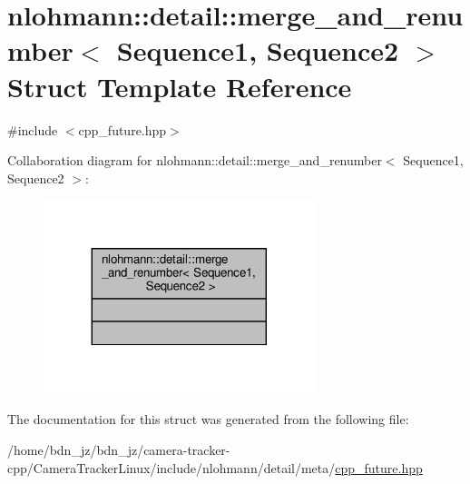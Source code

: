 \hypertarget{structnlohmann_1_1detail_1_1merge__and__renumber}{}\section{nlohmann\+:\+:detail\+:\+:merge\+\_\+and\+\_\+renumber$<$ Sequence1, Sequence2 $>$ Struct Template Reference}
\label{structnlohmann_1_1detail_1_1merge__and__renumber}


{\ttfamily \#include $<$cpp\+\_\+future.\+hpp$>$}



Collaboration diagram for nlohmann\+:\+:detail\+:\+:merge\+\_\+and\+\_\+renumber$<$ Sequence1, Sequence2 $>$\+:
\nopagebreak
\begin{figure}[H]
\begin{center}
\leavevmode
\includegraphics[width=224pt]{structnlohmann_1_1detail_1_1merge__and__renumber__coll__graph}
\end{center}
\end{figure}


The documentation for this struct was generated from the following file\+:\begin{DoxyCompactItemize}
\item 
/home/bdn\+\_\+jz/bdn\+\_\+jz/camera-\/tracker-\/cpp/\+Camera\+Tracker\+Linux/include/nlohmann/detail/meta/\hyperlink{cpp__future_8hpp}{cpp\+\_\+future.\+hpp}\end{DoxyCompactItemize}
